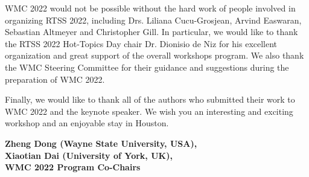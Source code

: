 \documentclass{article}
\begin{document}
\vspace{0.5em}

WMC 2022 would not be possible without the hard work of people involved in organizing RTSS 2022, including Drs. Liliana Cucu-Grosjean, Arvind Easwaran, Sebastian Altmeyer and Christopher Gill. In particular, we would like to thank the RTSS 2022 Hot-Topics Day chair Dr. Dionisio de Niz for his excellent organization and great support of the overall workshops program. We also thank the WMC
Steering Committee for their guidance and suggestions during the preparation of WMC 2022.

\vspace{0.5em}

Finally, we would like to thank all of the authors who submitted their work to WMC 2022 and the keynote speaker. We wish you an interesting and exciting workshop and an enjoyable stay in Houston.

\vspace{1.5em}

\noindent 
\textbf{Zheng Dong (Wayne State University, USA), \\
Xiaotian Dai (University of York, UK),\\
WMC 2022 Program Co-Chairs}

\vfill

\clearpage

\renewcommand{\contentsname}{Technical Program}
\tableofcontents



















\clearpage
\end{document}
